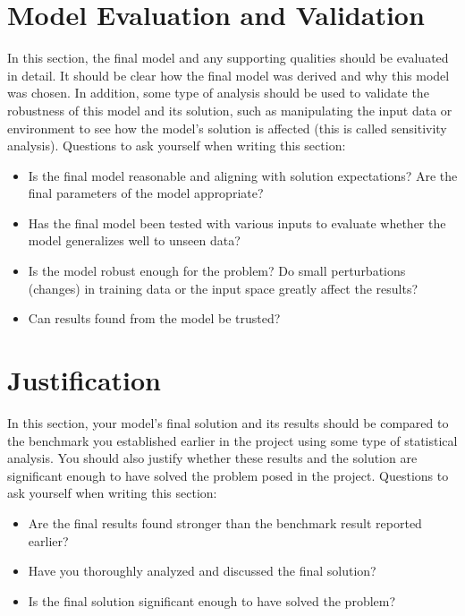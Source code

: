 \documentclass[twoside,openright,titlepage,numbers=noenddot,headinclude,%
               footinclude=true,cleardoublepage=empty,abstractoff,BCOR=5mm,%
               paper=a4,fontsize=11pt,ngerman,american]{scrreprt}
\numberwithin{theorem}{chapter}
\numberwithin{definition}{chapter}
\numberwithin{algorithm}{chapter}
\numberwithin{figure}{chapter}
\numberwithin{table}{chapter}
\numberwithin{equation}{chapter}
\begin{document}
\section*{Model Evaluation and Validation}
In this section, the final model and any supporting qualities should be evaluated in detail. It should be clear how the final model was derived and why this model was chosen. In addition, some type of analysis should be used to validate the robustness of this model and its solution, such as manipulating the input data or environment to see how the model’s solution is affected (this is called sensitivity analysis). Questions to ask yourself when writing this section:
\begin{itemize}%
\item Is the final model reasonable and aligning with solution expectations? Are the final parameters of the model appropriate?
\item Has the final model been tested with various inputs to evaluate whether the model generalizes well to unseen data?
\item Is the model robust enough for the problem? Do small perturbations (changes) in training data or the input space greatly affect the results?
\item Can results found from the model be trusted?
\end{itemize}

\section*{Justification}
In this section, your model’s final solution and its results should be compared to the benchmark you established earlier in the project using some type of statistical analysis. You should also justify whether these results and the solution are significant enough to have solved the problem posed in the project. Questions to ask yourself when writing this section:
\begin{itemize}%
\item Are the final results found stronger than the benchmark result reported earlier?
\item Have you thoroughly analyzed and discussed the final solution?
\item Is the final solution significant enough to have solved the problem?
\end{itemize}

\end{document}
